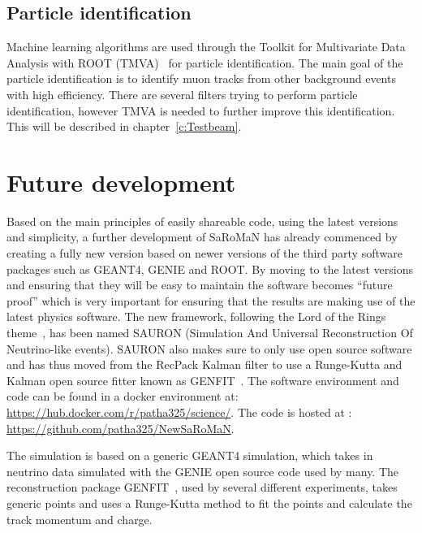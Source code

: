 \subsection{Particle identification}
Machine learning algorithms are used through the Toolkit for Multivariate Data Analysis with ROOT (TMVA)~\cite{TMVA} for particle identification. The main goal of the particle identification is to identify muon tracks from other background events with high efficiency. There are several filters trying to perform particle identification, however TMVA is needed to further improve this identification. This will be described in chapter~\ref{c:Testbeam}.



\section{Future development}
Based on the main principles of easily shareable code, using the latest versions and simplicity, a further development of SaRoMaN has already commenced by creating a fully new version based on newer versions of the third party software packages such as GEANT4, GENIE and ROOT. By moving to the latest versions and ensuring that they will be easy to maintain the software becomes ``future proof'' which is very important for ensuring that the results are making use of the latest physics software. The new framework, following the Lord of the Rings theme~\cite{79tolkien2012lord}, has been named SAURON (Simulation And Universal Reconstruction Of Neutrino-like events). SAURON also makes sure to only use open source software and has thus moved from the RecPack Kalman filter to use a Runge-Kutta and Kalman open source fitter known as GENFIT~\cite{81Genfit}.
The software environment and code can be found in a docker environment at: \url{https://hub.docker.com/r/patha325/science/}. The code is hosted at : \url{https://github.com/patha325/NewSaRoMaN}.

The simulation is based on a generic GEANT4 simulation, which takes in neutrino data simulated with the GENIE open source code used by many. The reconstruction package  GENFIT~\cite{81Genfit}, used by several different experiments, takes generic points and uses a Runge-Kutta method to fit the points and calculate the track momentum and charge.

